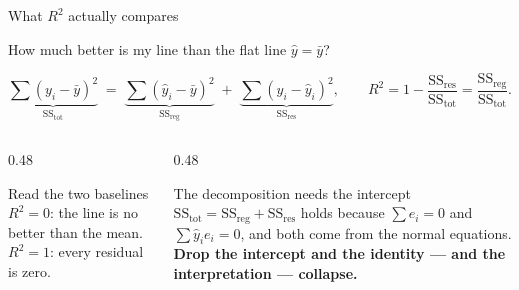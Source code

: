 \documentclass[aspectratio=169]{beamer}
\begin{document}
\begin{frame}[shrink=6]{What $R^2$ actually compares}
  \begin{exampleblock}{}
    \centering
    How much better is my line than the flat line $\hat y = \bar y$?
  \end{exampleblock}
  \vspace{0.2em}
  \[
    \underbrace{\sum (y_i - \bar y)^2}_{\mathrm{SS_{tot}}}
    \;=\;
    \underbrace{\sum (\hat y_i - \bar y)^2}_{\mathrm{SS_{reg}}}
    \;+\;
    \underbrace{\sum (y_i - \hat y_i)^2}_{\mathrm{SS_{res}}},
    \qquad
    R^2 = 1 - \frac{\mathrm{SS_{res}}}{\mathrm{SS_{tot}}}
        = \frac{\mathrm{SS_{reg}}}{\mathrm{SS_{tot}}} .
  \]
  \begin{columns}[T]
    \begin{column}{0.48\textwidth}
      \begin{block}{Read the two baselines}
        \small $R^2 = 0$: the line is no better than the mean.
        $R^2 = 1$: every residual is zero.
      \end{block}
    \end{column}
    \begin{column}{0.48\textwidth}
      \begin{alertblock}{The decomposition needs the intercept}
        \small $\mathrm{SS_{tot}} = \mathrm{SS_{reg}} + \mathrm{SS_{res}}$
        holds because $\sum e_i = 0$ and $\sum \hat y_i e_i = 0$, and both come
        from the normal equations. \textbf{Drop the intercept and the identity
        --- and the interpretation --- collapse.}
      \end{alertblock}
    \end{column}
  \end{columns}
\end{frame}
\end{document}
